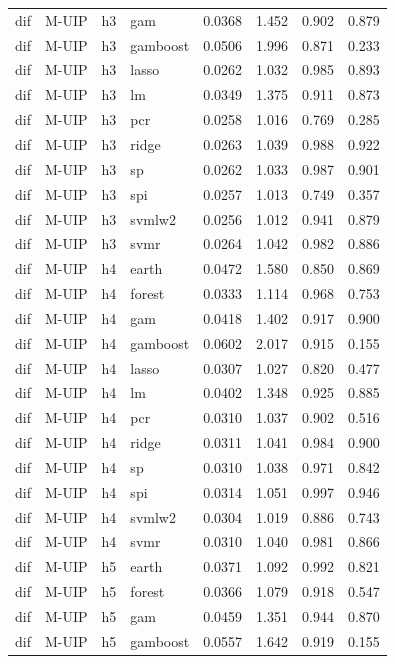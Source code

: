 \begin{ThreePartTable}
\begin{longtable}[t]{llclcccc}
dif & M-UIP & h3 & gam & 0.0368 & 1.452 & 0.902 & 0.879\\
dif & M-UIP & h3 & gamboost & 0.0506 & 1.996 & 0.871 & 0.233\\
dif & M-UIP & h3 & lasso & 0.0262 & 1.032 & 0.985 & 0.893\\
dif & M-UIP & h3 & lm & 0.0349 & 1.375 & 0.911 & 0.873\\
dif & M-UIP & h3 & pcr & 0.0258 & 1.016 & 0.769 & 0.285\\
dif & M-UIP & h3 & ridge & 0.0263 & 1.039 & 0.988 & 0.922\\
dif & M-UIP & h3 & sp & 0.0262 & 1.033 & 0.987 & 0.901\\
dif & M-UIP & h3 & spi & 0.0257 & 1.013 & 0.749 & 0.357\\
dif & M-UIP & h3 & svmlw2 & 0.0256 & 1.012 & 0.941 & 0.879\\
dif & M-UIP & h3 & svmr & 0.0264 & 1.042 & 0.982 & 0.886\\
\addlinespace
dif & M-UIP & h4 & earth & 0.0472 & 1.580 & 0.850 & 0.869\\
dif & M-UIP & h4 & forest & 0.0333 & 1.114 & 0.968 & 0.753\\
dif & M-UIP & h4 & gam & 0.0418 & 1.402 & 0.917 & 0.900\\
dif & M-UIP & h4 & gamboost & 0.0602 & 2.017 & 0.915 & 0.155\\
dif & M-UIP & h4 & lasso & 0.0307 & 1.027 & 0.820 & 0.477\\
dif & M-UIP & h4 & lm & 0.0402 & 1.348 & 0.925 & 0.885\\
dif & M-UIP & h4 & pcr & 0.0310 & 1.037 & 0.902 & 0.516\\
dif & M-UIP & h4 & ridge & 0.0311 & 1.041 & 0.984 & 0.900\\
dif & M-UIP & h4 & sp & 0.0310 & 1.038 & 0.971 & 0.842\\
dif & M-UIP & h4 & spi & 0.0314 & 1.051 & 0.997 & 0.946\\
dif & M-UIP & h4 & svmlw2 & 0.0304 & 1.019 & 0.886 & 0.743\\
dif & M-UIP & h4 & svmr & 0.0310 & 1.040 & 0.981 & 0.866\\
\addlinespace
dif & M-UIP & h5 & earth & 0.0371 & 1.092 & 0.992 & 0.821\\
dif & M-UIP & h5 & forest & 0.0366 & 1.079 & 0.918 & 0.547\\
dif & M-UIP & h5 & gam & 0.0459 & 1.351 & 0.944 & 0.870\\
dif & M-UIP & h5 & gamboost & 0.0557 & 1.642 & 0.919 & 0.155\\

\end{longtable}
\end{ThreePartTable}
